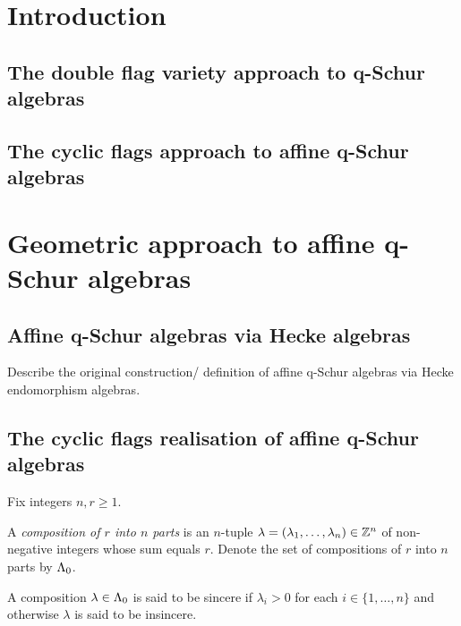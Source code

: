 \documentclass[a4paper, 11pt]{report}
\begin{document}
\maketitle
\tableofcontents

\chapter{Introduction}

\section{The double flag variety approach to q-Schur algebras}

\section{The cyclic flags approach to affine q-Schur algebras}



\chapter{Geometric approach to affine q-Schur algebras}

\section{Affine q-Schur algebras via Hecke algebras}

{\color{red}Describe the original construction/ definition of affine q-Schur algebras via Hecke endomorphism algebras.}

\section{The cyclic flags realisation of affine q-Schur algebras}

Fix integers $n,r\geq 1$.

\begin{definition}\label{def:compositions}
A \emph{composition of $r$ into $n$ parts} is an $n$-tuple $\lambda=(\lambda_1,\ldots,\lambda_n)\in\mathbb{Z}^n$ of non-negative integers whose sum equals $r$. Denote the set of compositions of $r$ into $n$ parts by $\Lambda_0{}$.
\end{definition}

A composition $\lambda\in\Lambda_0{}$ is said to be sincere if $\lambda_i>0$ for each $i\in\{1,\ldots,n\}$ and otherwise $\lambda$ is said to be insincere.
\end{document}
